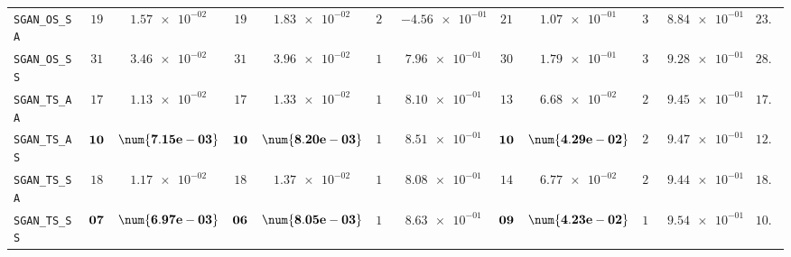 \begin{xltabular}{\textwidth}{l||cC|cC|cC|cC|cC||c}
	\texttt{SGAN\_OS\_SA} & $ 19$ & $ \num{1.57e-02}$ & $ 19$ & $ \num{1.83e-02}$ & $ 25$ & $ \num{-4.56e-01}$ & $ 21$ & $ \num{1.07e-01}$ & $ 35$ & $ \num{8.84e-01}$ & $ 23.8$  \\
	\texttt{SGAN\_OS\_SS} & $ 31$ & $ \num{3.46e-02}$ & $ 31$ & $ \num{3.96e-02}$ & $ 19$ & $ \num{7.96e-01}$ & $ 30$ & $ \num{1.79e-01}$ & $ 32$ & $ \num{9.28e-01}$ & $ 28.6$  \\
	\texttt{SGAN\_TS\_AA} & $ 17$ & $ \num{1.13e-02}$ & $ 17$ & $ \num{1.33e-02}$ & $ 15$ & $ \num{8.10e-01}$ & $ 13$ & $ \num{6.68e-02}$ & $ 23$ & $ \num{9.45e-01}$ & $ 17.0$  \\
	\texttt{SGAN\_TS\_AS} & $\bf 10$ & $\bf \num{7.15e-03}$ & $\bf 10$ & $\bf \num{8.20e-03}$ & $ 12$ & $ \num{8.51e-01}$ & $\bf 10$ & $\bf \num{4.29e-02}$ & $ 21$ & $ \num{9.47e-01}$ & $ 12.6$  \\
	\texttt{SGAN\_TS\_SA} & $ 18$ & $ \num{1.17e-02}$ & $ 18$ & $ \num{1.37e-02}$ & $ 17$ & $ \num{8.08e-01}$ & $ 14$ & $ \num{6.77e-02}$ & $ 24$ & $ \num{9.44e-01}$ & $ 18.2$  \\
	\texttt{SGAN\_TS\_SS} & $\bf 07$ & $\bf \num{6.97e-03}$ & $\bf 06$ & $\bf \num{8.05e-03}$ & $ 11$ & $ \num{8.63e-01}$ & $\bf 09$ & $\bf \num{4.23e-02}$ & $ 18$ & $ \num{9.54e-01}$ & $ 10.2$  \\ \midrule

\end{xltabular}
